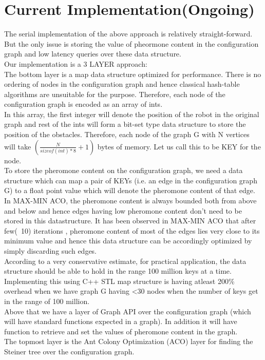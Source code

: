 \documentclass{article}
\begin{document}
\section{Current Implementation(Ongoing)}
The serial implementation of the above approach is relatively straight-forward. But the only issue is storing the value of pheormone content in the configuration graph and low latency queries over these data structure. \\
Our implementation is a 3 LAYER approach: \\
The bottom layer is a map data structure optimized for performance.
There is no ordering of nodes in the configuration graph and hence classical hash-table algorithms are unsuitable for the purpose. Therefore, each node of the configuration graph is encoded as an array of ints. \\
In this array, the first integer will denote the  position of the robot in the original graph and rest of the ints will form a bit-set type data structure to store the position of the obstacles. Therefore, each node of the graph G with N vertices will take $(\frac{N}{sizeof(int)*8} +1)$ bytes of memory. Let us call this to be KEY for the node. \\
To store the pheromone content on the configuration graph, we need a data structure which can map a pair of KEYs (i.e. an edge in the configuration graph G) to a float point value which will denote the pheromone content of that edge. In MAX-MIN ACO, the pheromone content is always bounded both from above and below and hence edges having low pheromone content don't need to be stored in this datastructure. It has been observed in MAX-MIN ACO that after few(~10) iterations , pheromone content of most of the edges lies very close to its minimum value and hence this data structure can be accordingly optimized by simply discarding such edges. \\
According to a very conservative estimate, for practical application, the data structure should be able to hold in the range 100 million keys at a time. Implementing this using C++ STL map structure is having atleast 200\% overhead when we have graph G having <30 nodes when the number of keys get in the range of 100 million. \\
Above that we have a layer of Graph API over the configuration graph (which will have standard functions expected in a graph). In addition it will have function to retrieve and set the values of pheromone content in the graph. \\
The topmost layer is the Ant Colony Optimization (ACO) layer for finding the Steiner tree over the configuration graph. \\
\end{document}
